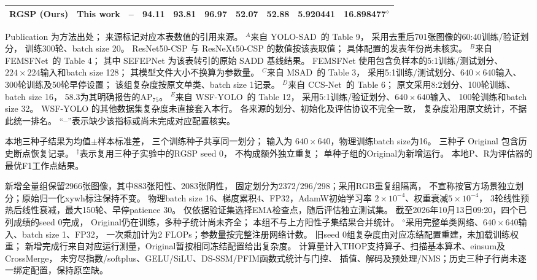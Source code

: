 \begin{table}[!t]
\begin{tabular*}{\textwidth}{@{\extracolsep{\fill}}lccrrrrrrr}
RGSP (Ours)
& This work & --
& 94.11 & 93.81 & 96.97 & 52.07 & 52.88
& 5.920441 & 16.898477$^{\diamond}$ \\
\bottomrule
\end{tabular*}
\smallskip
\begin{minipage}{\linewidth}
\footnotesize
Publication 为方法出处；
来源标记对应本表数值的引用来源。
$^{A}$来自 YOLO-SAD~\cite{yolosad2024}的 Table 9，
采用去重后701张图像的60:40训练/验证划分，
训练300轮、batch size 20。
ResNet50-CSP 与 ResNeXt50-CSP 的数值按该表取值；
具体配置的发表年份尚未核实。
$^{B}$来自 FEMSFNet~\cite{femsfnet2024}的 Table 4；
其中 SEFEPNet 为该表转引的原始 SADD 基线结果。
FEMSFNet 使用包含负样本的5:1训练/测试划分、
$224\times224$输入和batch size 128；
其模型文件大小不换算为参数量。
$^{C}$来自 MSAD~\cite{msad2025}的 Table 3，
采用5:1训练/测试划分、$640\times640$输入、
300轮训练及50轮早停设置；
该组复杂度按原文单类、batch size 1记录。
$^{D}$来自 CCS-Net~\cite{ccsnet2026}的 Table 6；
原文采用8:2划分、100轮训练、batch size 16，
58.3为其明确报告的AP$_{75}$。
$^{E}$来自 WSF-YOLO~\cite{wsfyolo2026}的 Table 12，
采用5:1训练/验证划分、$640\times640$输入、
100轮训练和batch size 32。
WSF-YOLO 的其他数据集复杂度未直接套入本行。
各来源的划分、初始化及评估协议不完全一致，
复杂度沿用原文统计，不据此统一排名。
“--”表示缺少该指标或尚未完成对应配置核实。

本地三种子结果为均值$\pm$样本标准差，
三个训练种子共享同一划分；
输入为 $640\times640$，物理训练batch size为16。
三种子 Original 包含历史断点恢复记录。
$^{\dagger}$表示复用三种子实验中的RGSP seed 0，
不构成额外独立重复；
单种子组的Original为新增运行。
本地P、R为评估器的最优F1工作点结果。

新增全量组保留2966张图像，其中883张阳性、2083张阴性，
固定划分为2372/296/298；采用RGB重复组隔离，
不宣称按官方场景独立划分；原始归一化xywh标注保持不变。
物理batch size 16、梯度累积4、FP32，AdamW初始学习率
$2\times10^{-4}$、权重衰减$5\times10^{-4}$，
3轮线性预热后线性衰减，最大150轮、早停patience 30。
仅依据验证集选择EMA检查点，随后评估独立测试集。
截至2026年10月13日09:20，四个已列成绩的seed 0完成，
Original仍在训练，多种子统计尚未齐全；
本组不与上方阳性子集结果合并统计。
$^{\diamond}$采用完整单类网络、$640\times640$输入、batch size 1、FP32，
一次乘加计为2 FLOPs；参数量按完整注册网络计数。
旧seed 0组复杂度由对应冻结配置重建，未加载训练权重；
新增完成行来自对应运行测量，Original暂按相同冻结配置给出复杂度。
计算量计入THOP支持算子、扫描基本算术、einsum及CrossMerge，
未穷尽指数/softplus、GELU/SiLU、DS-SSM/PFIM函数式统计与门控、
插值、解码及预处理/NMS；历史三种子行尚未逐一绑定配置，保持原空缺。
\end{minipage}
\end{table}

